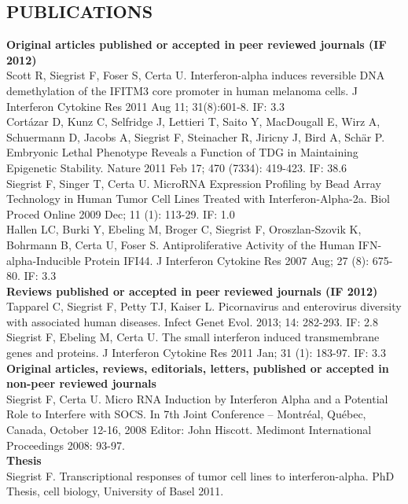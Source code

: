 \documentclass{res}
\begin{document}
\begin{resume}
\section{PUBLICATIONS} 
\vspace{0.1in}
   {\bf  Original articles published or accepted in peer reviewed journals (IF 2012)}  \\
Scott R, Siegrist F, Foser S, Certa U. Interferon-alpha induces reversible DNA demethylation of the IFITM3 core promoter in human melanoma cells. J Interferon Cytokine Res 2011 Aug 11; 31(8):601-8. IF: 3.3 \\
Cortázar D, Kunz C, Selfridge J, Lettieri T, Saito Y, MacDougall E, Wirz A, Schuermann D, Jacobs A, Siegrist F, Steinacher R, Jiricny J, Bird A, Schär P. Embryonic Lethal Phenotype Reveals a Function of TDG in Maintaining Epigenetic Stability. Nature 2011 Feb 17; 470 (7334): 419-423. IF: 38.6 \\
Siegrist F, Singer T, Certa U. MicroRNA Expression Profiling by Bead Array Technology in Human Tumor Cell Lines Treated with Interferon-Alpha-2a. Biol Proced Online 2009 Dec; 11 (1): 113-29. IF: 1.0 \\
Hallen LC, Burki Y, Ebeling M, Broger C, Siegrist F, Oroszlan-Szovik K, Bohrmann B, Certa U, Foser S. Antiproliferative Activity of the Human IFN-alpha-Inducible Protein IFI44. J Interferon Cytokine Res 2007 Aug; 27 (8): 675-80. IF: 3.3 \\
   {\bf  Reviews published or accepted in peer reviewed journals (IF 2012)}  \\
Tapparel C, Siegrist F, Petty TJ, Kaiser L. Picornavirus and enterovirus diversity with associated human diseases. Infect Genet Evol. 2013; 14: 282-293. IF: 2.8 \\
Siegrist F, Ebeling M, Certa U. The small interferon induced transmembrane genes and proteins. J Interferon Cytokine Res 2011 Jan; 31 (1): 183-97. IF: 3.3 \\
   {\bf  Original articles, reviews, editorials, letters, published or accepted in non-peer reviewed journals}  \\
Siegrist F, Certa U. Micro RNA Induction by Interferon Alpha and a Potential Role to Interfere with SOCS. In 7th Joint Conference – Montréal, Québec, Canada, October 12-16, 2008 Editor: John Hiscott. Medimont International Proceedings 2008: 93-97. \\
   {\bf  Thesis}  \\
Siegrist F. Transcriptional responses of tumor cell lines to interferon-alpha. PhD Thesis, cell biology, University of Basel 2011. \\

\end{resume}
\end{document}
